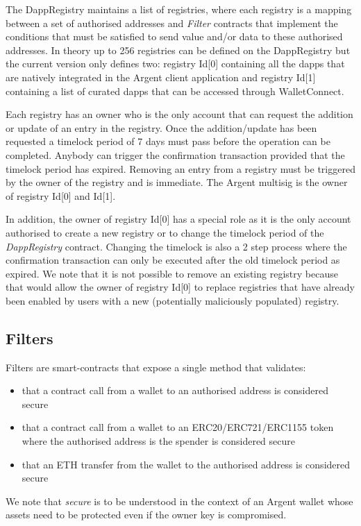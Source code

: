 \documentclass[12pt]{article}
\begin{document}
The DappRegistry maintains a list of registries, where each registry is a mapping between a set of authorised addresses and \emph{Filter} contracts that implement the conditions that must be satisfied to send value and/or data to these authorised addresses. In theory up to 256 registries can be defined on the DappRegistry but the current version only defines two: registry Id[0] containing all the dapps that are natively integrated in the Argent client application and registry Id[1] containing a list of curated dapps that can be accessed through WalletConnect. 

Each registry has an owner who is the only account that can request the addition or update of an entry in the registry. Once the addition/update has been requested a timelock period of 7 days must pass before the operation can be completed. Anybody can trigger the confirmation transaction provided that the timelock period has expired. Removing an entry from a registry must be triggered by the owner of the registry and is immediate. The Argent multisig is the owner of registry Id[0] and Id[1].

In addition, the owner of registry Id[0] has a special role as it is the only account authorised to create a new registry or to change the timelock period of the \emph{DappRegistry} contract. Changing the timelock is also a 2 step process where the confirmation transaction can only be executed after the old timelock period as expired. We note that it is not possible to remove an existing registry because that would allow the owner of registry Id[0] to replace registries that have already been enabled by users with a new (potentially maliciously populated) registry.

\subsection{Filters}
\label{sec:filters}

Filters are smart-contracts that expose a single method that validates:
\begin{itemize}
    \item that a contract call from a wallet to an authorised address is considered secure
    \item that a contract call from a wallet to an ERC20/ERC721/ERC1155 token where the authorised address is the spender is considered secure
    \item that an ETH transfer from the wallet to the authorised address is considered secure
\end{itemize}
 We note that \textit{secure} is to be understood in the context of an Argent wallet whose assets need to be protected even if the owner key is compromised. \\
\end{document}
